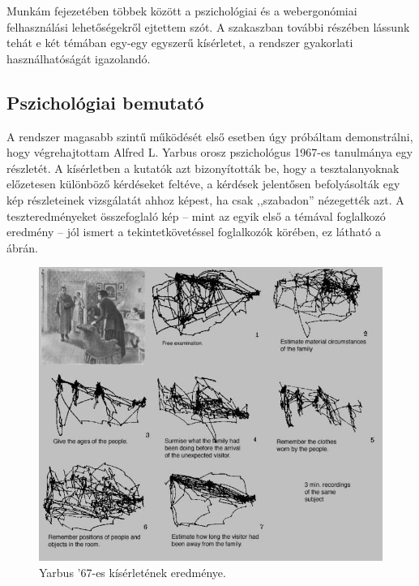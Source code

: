 Munkám  fejezetében többek között a pszichológiai és a webergonómiai felhasználási lehetőségekről ejtettem szót. A szakaszban további részében lássunk tehát e két témában egy-egy egyszerű kísérletet, a rendszer gyakorlati használhatóságát igazolandó. 

\subsection{Pszichológiai bemutató}\label{sect:pszicho}

A rendszer magasabb szintű működését első esetben úgy próbáltam demonstrálni, hogy végrehajtottam Alfred L. Yarbus orosz pszichológus 1967-es tanulmánya egy részletét. A kísérletben a kutatók azt bizonyították be, hogy a tesztalanyoknak előzetesen különböző kérdéseket feltéve, a kérdések jelentősen befolyásolták egy kép részleteinek vizsgálatát ahhoz képest, ha csak ,,szabadon'' nézegették azt. A teszteredményeket összefoglaló kép -- mint az egyik első a témával foglalkozó eredmény -- jól ismert a tekintetkövetéssel foglalkozók körében, ez látható a  ábrán.

\begin{figure}[!ht]
\centering
\includegraphics[width=140mm, keepaspectratio]{figures/yarbus.jpg}
\caption{Yarbus '67-es kísérletének eredménye.}
\label{fig:yarbus}
\end{figure}

